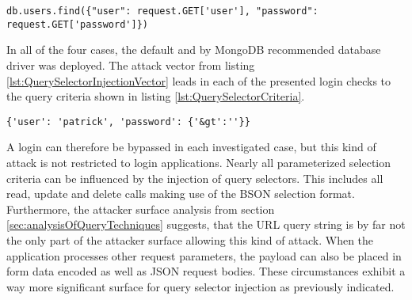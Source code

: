 \begin{lstlisting}[caption={Vulnerable Python example for query selector injection on MongoDB}, label={lst:PythonQuerySelectorInjection}]
db.users.find({"user": request.GET['user'], "password": request.GET['password']})
\end{lstlisting}

In all of the four cases, the default and by MongoDB recommended database driver was deployed. The attack vector from listing \ref{lst:QuerySelectorInjectionVector} leads in each of the presented login checks to the query criteria shown in listing \ref{lst:QuerySelectorCriteria}. \\

\begin{lstlisting}[caption={Resulting query of query selector injection}, label={lst:QuerySelectorCriteria}]
{'user': 'patrick', 'password': {'&gt':''}}
\end{lstlisting}

A login can therefore be bypassed in each investigated case, but this kind of attack is not restricted to login applications. Nearly all parameterized selection criteria can be influenced by the injection of query selectors. This includes all read, update and delete calls making use of the BSON selection format. Furthermore, the attacker surface analysis from section \ref{sec:analysisOfQueryTechniques} suggests, that the URL query string is by far not the only part of the attacker surface allowing this kind of attack. When the application processes other request parameters, the payload can also be placed in form data encoded as well as JSON request bodies. These circumstances exhibit a way more significant surface for query selector injection as previously indicated. \\


